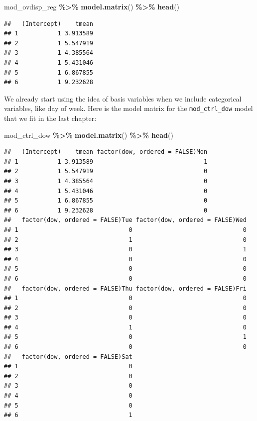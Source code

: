 \documentclass[
]{book}
\newenvironment{Shaded}{\begin{snugshade}}{\end{snugshade}}
\newcommand{\FunctionTok}[1]{\textcolor[rgb]{0.13,0.29,0.53}{\textbf{#1}}}
\newcommand{\NormalTok}[1]{#1}
\newcommand{\SpecialCharTok}[1]{\textcolor[rgb]{0.81,0.36,0.00}{\textbf{#1}}}
\begin{document}
\begin{Shaded}
\begin{Highlighting}[]
\NormalTok{mod\_ovdisp\_reg }\SpecialCharTok{\%\textgreater{}\%} 
  \FunctionTok{model.matrix}\NormalTok{() }\SpecialCharTok{\%\textgreater{}\%} 
  \FunctionTok{head}\NormalTok{()}
\end{Highlighting}
\end{Shaded}

\begin{verbatim}
##   (Intercept)    tmean
## 1           1 3.913589
## 2           1 5.547919
## 3           1 4.385564
## 4           1 5.431046
## 5           1 6.867855
## 6           1 9.232628
\end{verbatim}

We already start using the idea of basis variables when we include categorical variables, like
day of week. Here is the model matrix for the \texttt{mod\_ctrl\_dow} model that we fit in the last
chapter:

\begin{Shaded}
\begin{Highlighting}[]
\NormalTok{mod\_ctrl\_dow }\SpecialCharTok{\%\textgreater{}\%} 
  \FunctionTok{model.matrix}\NormalTok{() }\SpecialCharTok{\%\textgreater{}\%} 
  \FunctionTok{head}\NormalTok{()}
\end{Highlighting}
\end{Shaded}

\begin{verbatim}
##   (Intercept)    tmean factor(dow, ordered = FALSE)Mon
## 1           1 3.913589                               1
## 2           1 5.547919                               0
## 3           1 4.385564                               0
## 4           1 5.431046                               0
## 5           1 6.867855                               0
## 6           1 9.232628                               0
##   factor(dow, ordered = FALSE)Tue factor(dow, ordered = FALSE)Wed
## 1                               0                               0
## 2                               1                               0
## 3                               0                               1
## 4                               0                               0
## 5                               0                               0
## 6                               0                               0
##   factor(dow, ordered = FALSE)Thu factor(dow, ordered = FALSE)Fri
## 1                               0                               0
## 2                               0                               0
## 3                               0                               0
## 4                               1                               0
## 5                               0                               1
## 6                               0                               0
##   factor(dow, ordered = FALSE)Sat
## 1                               0
## 2                               0
## 3                               0
## 4                               0
## 5                               0
## 6                               1
\end{verbatim}
\end{document}
